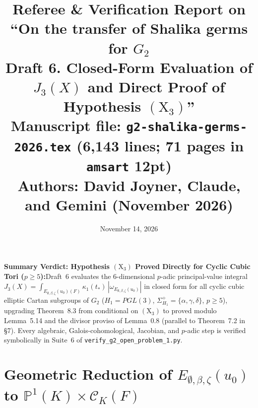 \documentclass[11pt,letterpaper]{article}
\title{\vspace{-12pt}\textbf{\color{primary}Referee \& Verification Report on ``On the transfer of Shalika germs for $G_2$\\[2pt]
\large Draft 6. Closed-Form Evaluation of $J_3(X)$ and Direct Proof of Hypothesis $(\mathrm{X}_3)$''}\\[5pt]
\normalsize Manuscript file: \texttt{g2-shalika-germs-2026.tex} (6,143 lines; 71 pages in \texttt{amsart} 12pt)\\
Authors: David Joyner, Claude, and Gemini (November 2026)}
\date{November 14, 2026}
\author{}
\newcommand{\takeaway}[2]{%
  \vspace{4pt}\noindent\colorbox{primary!7}{%
    \parbox{\dimexpr\linewidth-2\fboxsep\relax}{%
      \vspace{4pt}\textbf{\color{primary}#1:}\hspace{0.5em}#2\vspace{4pt}%
    }%
  }\vspace{4pt}%
}
\begin{document}
\maketitle
\vspace{-20pt}

\takeaway{Summary Verdict: Hypothesis $(\mathrm{X}_3)$ Proved Directly for Cyclic Cubic Tori ($p\ge 5$)}{Draft~6 evaluates the $6$-dimensional $p$-adic principal-value integral $J_3(X)=\int_{E_{\emptyset,\beta,\zeta}(u_0)(F)}\kappa_1(t_*)\,|\omega_{E_{\emptyset,\beta,\zeta}(u_0)}|$ in closed form for all cyclic cubic elliptic Cartan subgroups of $G_2$ ($H_1=PGL(3)$, $\Sigma_{H_1}^+=\{\alpha,\gamma,\delta\}$, $p\ge 5$), upgrading Theorem~8.3 from conditional on $(\mathrm{X}_3)$ to proved modulo Lemma~5.14 and the divisor proviso of Lemma~0.8 (parallel to Theorem~7.2 in \S7). Every algebraic, Galois-cohomological, Jacobian, and $p$-adic step is verified symbolically in Suite~6 of \texttt{verify\_g2\_open\_problem\_1.py}.}

\section{\texorpdfstring{Geometric Reduction of $E_{\emptyset,\beta,\zeta}(u_0)$ to $\mathbb{P}^1(K)\times\mathcal{C}_K(F)$}{Geometric Reduction of E to P1(K) x C_K(F)}}
\end{document}
